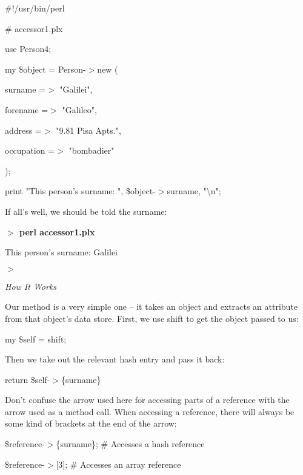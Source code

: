\documentclass[a4paper,11pt]{book}
\begin{document}
\noindent 

\noindent 

\noindent \#!/usr/bin/perl

\noindent \# accessor1.plx

\noindent use Person4;

\noindent 

\noindent my \$object = Person-$>$new (

\noindent surname =$>$ "Galilei",

\noindent forename =$>$ "Galileo",

\noindent address =$>$ "9.81 Pisa Apts.",

\noindent occupation =$>$ "bombadier"

\noindent );

\noindent print "This person's surname: ", \$object-$>$surname, "\textbackslash n";

\noindent 

\noindent If all's well, we should be told the surname:

\noindent 

\noindent \textbf{$>$ perl accessor1.plx}

\noindent This person's surname: Galilei

\noindent $>$

\noindent 

\noindent \textit{How It Works}

\noindent Our method is a very simple one -- it takes an object and extracts an attribute from that object's data store. First, we use shift to get the object passed to us:

\noindent 

\noindent my \$self = shift;

\noindent 

\noindent Then we take out the relevant hash entry and pass it back:

\noindent 

\noindent return \$self-$>$\{surname\}

\noindent 

\noindent Don't confuse the arrow used here for accessing parts of a reference with the arrow used as a method call. When accessing a reference, there will always be some kind of brackets at the end of the arrow:

\noindent 

\noindent \$reference-$>$\{surname\}; \# Accesses a hash reference

\noindent \$reference-$>$[3]; \# Accesses an array reference
\end{document}
